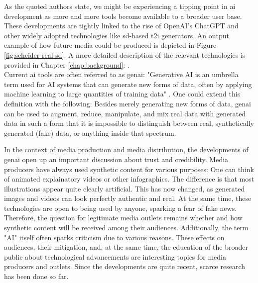 \documentclass[
  a4paper,  %
  twoside,  %
  bibliography=totoc,
  headsepline,
  cleardoublepage=empty,
  parskip=half,
  draft=false
]{scrbook}
\begin{document}
As the quoted authors state, we might be experiencing a tipping point in \gls{ai} development as more and more tools become available to a broader user base. These developments are tightly linked to the rise of OpenAI's ChatGPT and other widely adopted technologies like \gls{sd}-based \gls{t2i} generators. An output example of how future media could be produced is depicted in Figure \ref{fig:scheider-real-sd}. A more detailed description of the relevant technologies is provided in Chapter \ref{chap:background}: . \\
Current \gls{ai} tools are often referred to as \gls{genai}: "Generative AI is an umbrella term used for AI systems that can generate new forms of data, often by applying machine learning to large quantities of training data" \cite{arguedasAutomatingDemocracyGenerative2023}. One could extend this definition with the following: Besides merely generating new forms of data, \gls{genai} can be used to augment, reduce, manipulate, and mix real data with generated data in such a form that it is impossible to distinguish between real, synthetically generated (fake) data, or anything inside that spectrum.

In the context of media production and media distribution, the developments of \gls{genai} open up an important discussion about trust and credibility. Media producers have always used synthetic content for various purposes: One can think of animated explainatory videos or other infographics. The difference is that most illustrations appear quite clearly artificial. This has now changed, as generated images and videos can look perfectly authentic and real. At the same time, these technologies are open to being used by anyone, sparking a fear of fake news. Therefore, the question for legitimate media outlets remains whether and how synthetic content will be received among their audiences. Additionally, the term "AI" itself often sparks criticism due to various reasons. These effects on audiences, their mitigation, and, at the same time, the education of the broader public about technological advancements are interesting topics for media producers and outlets. Since the developments are quite recent, scarce research has been done so far.
\end{document}
